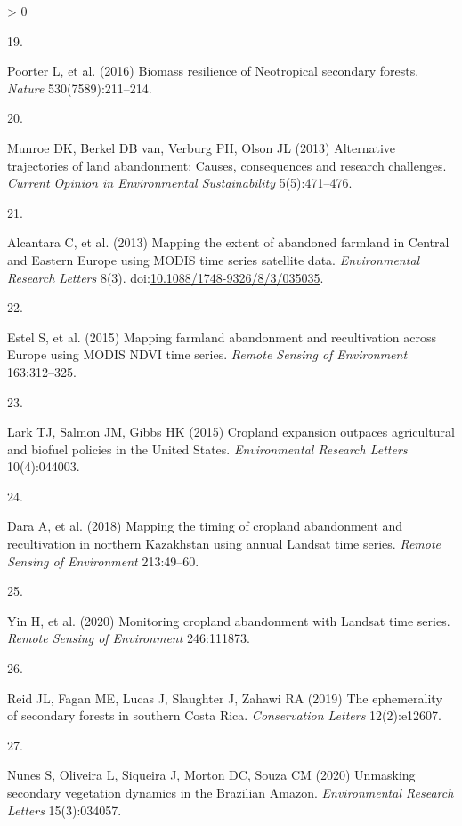 \documentclass[9pt,twocolumn,twoside,]{pnas-new}
\newlength{\csllabelwidth}
\newlength{\cslhangindent}
\newenvironment{CSLReferences}[2] %
 {%
  \setlength{\parindent}{0pt}
  \ifodd #1 \everypar{\setlength{\hangindent}{\cslhangindent}}\ignorespaces\fi
  \ifnum #2 > 0
  \setlength{\parskip}{#2\baselineskip}
  \fi
 }%
 {}
\newcommand{\CSLLeftMargin}[1]{\parbox[t]{\csllabelwidth}{#1}}
\newcommand{\CSLRightInline}[1]{\parbox[t]{\linewidth - \csllabelwidth}{#1}\break}
\begin{document}
\begin{CSLReferences}{0}{0}
\leavevmode\hypertarget{ref-Poorter2016}{}%
\CSLLeftMargin{19. }
\CSLRightInline{Poorter L, et al. (2016) {Biomass resilience of Neotropical secondary forests}. \emph{Nature} 530(7589):211--214.}

\leavevmode\hypertarget{ref-Munroe2013}{}%
\CSLLeftMargin{20. }
\CSLRightInline{Munroe DK, Berkel DB van, Verburg PH, Olson JL (2013) {Alternative trajectories of land abandonment: Causes, consequences and research challenges}. \emph{Current Opinion in Environmental Sustainability} 5(5):471--476.}

\leavevmode\hypertarget{ref-Alcantara2013}{}%
\CSLLeftMargin{21. }
\CSLRightInline{Alcantara C, et al. (2013) {Mapping the extent of abandoned farmland in Central and Eastern Europe using MODIS time series satellite data}. \emph{Environmental Research Letters} 8(3). doi:\href{https://doi.org/10.1088/1748-9326/8/3/035035}{10.1088/1748-9326/8/3/035035}.}

\leavevmode\hypertarget{ref-Estel2015}{}%
\CSLLeftMargin{22. }
\CSLRightInline{Estel S, et al. (2015) {Mapping farmland abandonment and recultivation across Europe using MODIS NDVI time series}. \emph{Remote Sensing of Environment} 163:312--325.}

\leavevmode\hypertarget{ref-Lark2015}{}%
\CSLLeftMargin{23. }
\CSLRightInline{Lark TJ, Salmon JM, Gibbs HK (2015) {Cropland expansion outpaces agricultural and biofuel policies in the United States}. \emph{Environmental Research Letters} 10(4):044003.}

\leavevmode\hypertarget{ref-Dara2018}{}%
\CSLLeftMargin{24. }
\CSLRightInline{Dara A, et al. (2018) {Mapping the timing of cropland abandonment and recultivation in northern Kazakhstan using annual Landsat time series}. \emph{Remote Sensing of Environment} 213:49--60.}

\leavevmode\hypertarget{ref-Yin2020}{}%
\CSLLeftMargin{25. }
\CSLRightInline{Yin H, et al. (2020) {Monitoring cropland abandonment with Landsat time series}. \emph{Remote Sensing of Environment} 246:111873.}

\leavevmode\hypertarget{ref-Reid2019}{}%
\CSLLeftMargin{26. }
\CSLRightInline{Reid JL, Fagan ME, Lucas J, Slaughter J, Zahawi RA (2019) {The ephemerality of secondary forests in southern Costa Rica}. \emph{Conservation Letters} 12(2):e12607.}

\leavevmode\hypertarget{ref-Nunes2020}{}%
\CSLLeftMargin{27. }
\CSLRightInline{Nunes S, Oliveira L, Siqueira J, Morton DC, Souza CM (2020) {Unmasking secondary vegetation dynamics in the Brazilian Amazon}. \emph{Environmental Research Letters} 15(3):034057.}


\end{CSLReferences}
\end{document}
